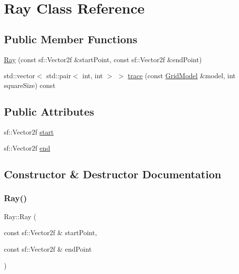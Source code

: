 \hypertarget{classRay}{}\section{Ray Class Reference}
\label{classRay}
\subsection*{Public Member Functions}
\begin{DoxyCompactItemize}
\item 
\hyperlink{classRay_a7e04c8417f29e874268ac2c804eb8f1c}{Ray} (const sf\+::\+Vector2f \&start\+Point, const sf\+::\+Vector2f \&end\+Point)
\item 
std\+::vector$<$ std\+::pair$<$ int, int $>$ $>$ \hyperlink{classRay_a991b8c09b3b6968dfe01d6e664171df1}{trace} (const \hyperlink{classGridModel}{Grid\+Model} \&model, int square\+Size) const
\end{DoxyCompactItemize}
\subsection*{Public Attributes}
\begin{DoxyCompactItemize}
\item 
sf\+::\+Vector2f \hyperlink{classRay_aa18b535335797f17f6d88e184d6cb7ca}{start}
\item 
sf\+::\+Vector2f \hyperlink{classRay_a636a32ba4f0f26b1cf072641c88725b7}{end}
\end{DoxyCompactItemize}


\subsection{Constructor \& Destructor Documentation}
\mbox{\label{classRay_a7e04c8417f29e874268ac2c804eb8f1c}} 
\subsubsection{\texorpdfstring{Ray()}{Ray()}}
{\footnotesize\ttfamily Ray\+::\+Ray (\begin{DoxyParamCaption}\item[{const sf\+::\+Vector2f \&}]{start\+Point,  }\item[{const sf\+::\+Vector2f \&}]{end\+Point }\end{DoxyParamCaption})\hspace{0.3cm}{\ttfamily [inline]}}



